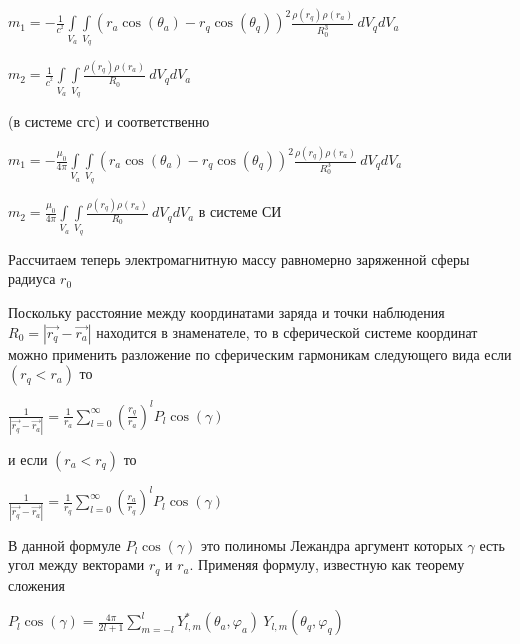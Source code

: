 \documentclass[11pt]{article}
\begin{document}
\(m_1= - \frac{1}{{{c}^{^{2}}}}\int\limits_{{{V}_{a}}}{\int\limits_{{{V}_{q}}}{\left( {{r}_{a}}\cos \left( {{\theta }_{a}} \right)-{{r}_{q}}\cos \left( {{\theta }_{q}} \right) \right)^2\frac{\rho \left( {{r}_{q}} \right)\rho \left( {{r}_{a}} \right)}{R_{0}^3}}}\ d{{V}_{q}}d{{V}_{a}}\)

\(m_2=\frac{1}{{{c}^{^{2}}}}\int\limits_{{{V}_{a}}}{\int\limits_{{{V}_{q}}}{\frac{\rho \left( {{r}_{q}} \right)\rho \left( {{r}_{a}} \right)}{R_{0}}}}\ d{{V}_{q}}d{{V}_{a}}\)

(в системе сгс) и соответственно

\(m_1= - \frac{{{\mu }_{0}}}{4\pi } \int\limits_{{{V}_{a}}}{\int\limits_{{{V}_{q}}}{\left( {{r}_{a}}\cos \left( {{\theta }_{a}} \right)-{{r}_{q}}\cos \left( {{\theta }_{q}} \right) \right)^2\frac{\rho \left( {{r}_{q}} \right)\rho \left( {{r}_{a}} \right)}{R_{0}^3}}}\ d{{V}_{q}}d{{V}_{a}}\)

\(m_2=\frac{{{\mu }_{0}}}{4\pi }\int\limits_{{{V}_{a}}}{\int\limits_{{{V}_{q}}}{\frac{\rho \left( {{r}_{q}} \right)\rho \left( {{r}_{a}} \right)}{R_{0}}}}\ d{{V}_{q}}d{{V}_{a}}\)
в системе СИ

    Рассчитаем теперь электромагнитную массу равномерно заряженной сферы
радиуса \({{r}_{0}}\)

Поскольку расстояние между координатами заряда и точки наблюдения
\({{R}_{0}}=\left|\overrightarrow{r_{q}} - \overrightarrow{r_{a}}\right|\)
находится в знаменателе, то в сферической системе координат можно
применить разложение по сферическим гармоникам следующего вида
\cite{flugge} если \(\left( {{r}_{q}}<{{r}_{a}} \right)\) то

\(\frac{1}{\left| \overrightarrow{{{r}_{q}}}-\overrightarrow{{{r}_{a}}} \right|}=\frac{1}{{{r}_{a}}}\sum\limits_{l=0}^{\infty }{{{\left( \frac{{{r}_{q}}}{{{r}_{a}}} \right)}^{l}}{{P}_{l}} \cos \left( \gamma \right)}\)

и если \(\left( {{r}_{a}}<{{r}_{q}} \right)\) то

\(\frac{1}{\left| \overrightarrow{{{r}_{q}}}-\overrightarrow{{{r}_{a}}} \right|}=\frac{1}{{{r}_{q}}}\sum\limits_{l=0}^{\infty }{{{\left( \frac{{{r}_{a}}}{{{r}_{q}}} \right)}^{l}}{{P}_{l}} \cos \left( \gamma \right)}\)

В данной формуле \({{P}_{l}} \cos \left( \gamma \right)\) это полиномы
Лежандра аргумент которых \(\gamma\) есть угол между векторами
\({{r}_{q}}\) и \({{r}_{a}}\). Применяя формулу, известную как теорему
сложения

\({{P}_{l}}\cos \left( \gamma \right)=\frac{4\pi }{2l+1}\sum\limits_{m=-l}^{l}{Y_{l,m}^{*}\left( {{\theta }_{a}},{{\varphi }_{a}} \right)}\ {{Y}_{l,m}}\left( {{\theta }_{q}},{{\varphi }_{q}} \right)\)
\end{document}
